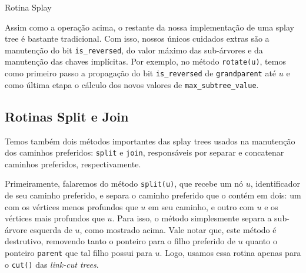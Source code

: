 \begin{algorithm}[h!]
    \caption{Rotina Splay}\label{splay:splay}
    \begin{algorithmic}[1]
         
         
        \Else
         
        \EndIf
        \EndIf
        \EndWhile
        \EndFunction
    \end{algorithmic}
\end{algorithm}

Assim como a operação acima, o restante da nossa implementação de uma splay tree é bastante tradicional. Com isso, nossos únicos cuidados extras são a manutenção do bit \texttt{is\_reversed}, do valor máximo das sub-árvores e da manutenção das chaves implícitas. Por exemplo, no método \texttt{rotate(u)}, temos como primeiro passo a propagação do bit \texttt{is\_reversed} de \texttt{grandparent} até $u$ e como última etapa o cálculo dos novos valores de \texttt{max\_subtree\_value}.

\subsection{Rotinas Split e Join}
\label{subsection:lct-splay-split-join}

Temos também dois métodos importantes das splay trees usados na manutenção dos caminhos preferidos: \texttt{split} e \texttt{join}, responsáveis por separar e concatenar caminhos preferidos, respectivamente.

Primeiramente, falaremos do método \texttt{split(u)}, que recebe um nó $u$, identificador de seu caminho preferido, e separa o caminho preferido que o contém em dois: um com os vértices menos profundos que $u$ em seu caminho, e outro com $u$ e os vértices mais profundos que $u$. Para isso, o método simplesmente separa a sub-árvore esquerda de $u$, como mostrado acima. Vale notar que, este método é destrutivo, removendo tanto o ponteiro para o filho preferido de $u$ quanto o ponteiro \texttt{parent} que tal filho possui para $u$. Logo, usamos essa rotina apenas para o \texttt{cut()} das \emph{link-cut trees}.

